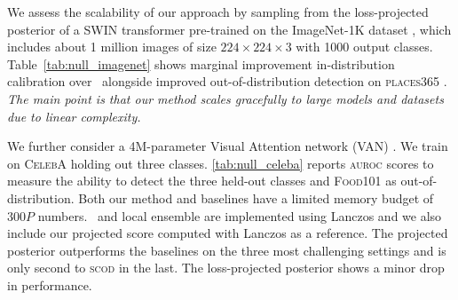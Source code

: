 We assess the scalability of our approach by sampling from the loss-projected posterior of a SWIN transformer \citep{liu2021swin} pre-trained on the ImageNet-1K dataset \citep{deng2009imagenet, russakovsky2015imagenet}, which includes about 1 million images of size $224\times224\times3$ with 1000 output classes. Table~\ref{tab:null_imagenet} shows marginal improvement in-distribution calibration over \MAP\ alongside improved out-of-distribution detection on \textsc{places365} \citep{zhou2017places}. \emph{The main point is that our method scales gracefully to large models and datasets due to linear complexity.}

We further consider a 4M-parameter Visual Attention network (\textsc{VAN}) \citep{guo2023visual}. We train on \textsc{CelebA} \citep{liu2015faceattributes} holding out three classes. \cref{tab:null_celeba} reports \textsc{auroc} scores to measure the ability to detect the three held-out classes and \textsc{Food101} \citep{bossard2014food} as out-of-distribution. Both our method and baselines have a limited memory budget of $300P$ numbers. \LLA\ and local ensemble are implemented using Lanczos and we also include our projected score computed with Lanczos as a reference.
The projected posterior outperforms the baselines on the three most challenging settings and is only second to \textsc{scod} in the last. The loss-projected posterior shows a minor drop in performance.

